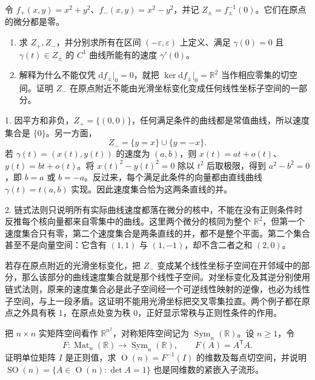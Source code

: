 \begin{exercise}
	\label{g1:ex:singular-level-velocities}
	令 \(f_+(x,y)=x^2+y^2\)、\(f_-(x,y)=x^2-y^2\)，并记 \(Z_\pm=f_\pm^{-1}(0)\)。它们在原点的微分都是零。
	\begin{enumerate}
		\item 求 \(Z_+,Z_-\)，并分别求所有在区间 \((-\varepsilon,\varepsilon)\) 上定义、满足 \(\gamma(0)=0\) 且 \(\gamma(t)\in Z_\pm\) 的 \(C^1\) 曲线所能有的速度 \(\gamma'(0)\)。
		\item 解释为什么不能仅凭 \(\mathrm{d}f_\pm|_0=0\)，就把 \(\ker\mathrm{d}f_\pm|_0=\mathbb R^2\) 当作相应零集的切空间。证明 \(Z_-\) 在原点附近不能由光滑坐标变化变成任何线性坐标子空间的一部分。
	\end{enumerate}
\end{exercise}
\begin{solution}
	1. 因平方和非负，\(Z_+=\{(0,0)\}\)，任何满足条件的曲线都是常值曲线，所以速度集合是 \(\{0\}\)。另一方面，
	\[
		Z_-=\{y=x\}\cup\{y=-x\}.
	\]
	若 \(\gamma(t)=(x(t),y(t))\) 的速度为 \((a,b)\)，则 \(x(t)=at+o(t)\)、\(y(t)=bt+o(t)\)。将 \(x(t)^2-y(t)^2=0\) 除以 \(t^2\) 后取极限，得到 \(a^2-b^2=0\)，即 \(b=a\) 或 \(b=-a\)。反过来，每个满足此条件的向量都由直线曲线 \(\gamma(t)=t(a,b)\) 实现。因此速度集合恰为这两条直线的并。

	2. 链式法则只说明所有实际曲线速度都落在微分的核中，不能在没有正则条件时反推每个核向量都来自零集中的曲线。这里两个微分的核同为整个 \(\mathbb R^2\)，但第一个速度集合只有零，第二个速度集合是两条直线的并，都不是整个平面。第二个集合甚至不是向量空间：它含有 \((1,1)\) 与 \((1,-1)\)，却不含二者之和 \((2,0)\)。

	若存在原点附近的光滑坐标变化，把 \(Z_-\) 变成某个线性坐标子空间在开邻域中的部分，那么该部分的曲线速度集合就是那个线性子空间。对坐标变化及其逆分别使用链式法则，原来的速度集合必是此子空间经一个可逆线性映射的逆像，也必为线性子空间，与上一段矛盾。这证明不能用光滑坐标把交叉零集拉直。两个例子都在原点之外具有秩 \(1\)，在原点处变为秩 \(0\)，正好显示常秩与正则性条件的作用。
\end{solution}
\begin{exercise}\label{g1:ex:orthogonal-group-level-set}
	把 \(n\times n\) 实矩阵空间看作 \(\mathbb R^{n^2}\)，对称矩阵空间记为 \(\operatorname{Sym}_n(\mathbb R)\)。设 \(n\ge1\)，令
	\[
		F:\operatorname{Mat}_n(\mathbb R)\to\operatorname{Sym}_n(\mathbb R),
		\qquad F(A)=A^{\mathsf T}A.
	\]
	证明单位矩阵 \(I\) 是正则值，求 \(\operatorname{O}(n)=F^{-1}(I)\) 的维数及每点切空间，并说明 \(\operatorname{SO}(n)=\{A\in\operatorname{O}(n):\det A=1\}\) 也是同维数的紧嵌入子流形。
\end{exercise}
